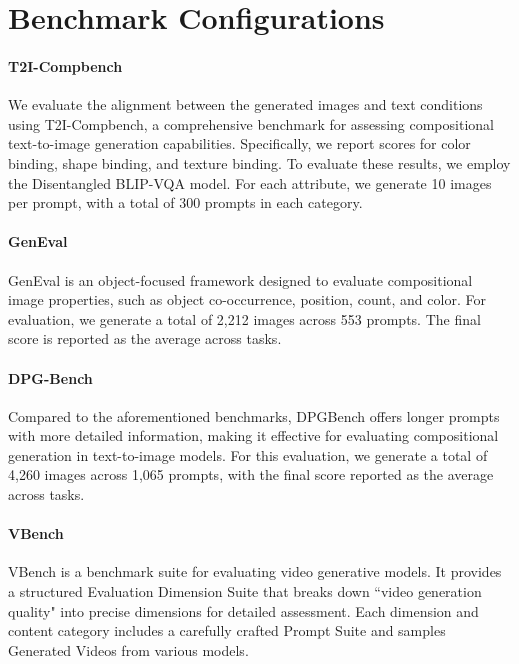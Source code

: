 
\clearpage
\appendix

\renewcommand{\thesection}{\Alph{section}}
\renewcommand{\thesection}{Appendix \Alph{section}}


\section{Benchmark Configurations}\label{appendix:bench-config}

\paragraph{T2I-Compbench~\citep{huang2023t2i-compbench}}  We evaluate the alignment between the generated images and text conditions using T2I-Compbench, a comprehensive benchmark for assessing compositional text-to-image generation capabilities. Specifically, we report scores for color binding, shape binding, and texture binding. To evaluate these results, we employ the Disentangled BLIP-VQA model. For each attribute, we generate 10 images per prompt, with a total of 300 prompts in each category.


\paragraph{GenEval~\citep{ghosh2024geneval}} GenEval is an object-focused framework designed to evaluate compositional image properties, such as object co-occurrence, position, count, and color. For evaluation, we generate a total of 2,212 images across 553 prompts. The final score is reported as the average across tasks.

\paragraph{DPG-Bench~\citep{hu2024ella_dbgbench}} Compared to the aforementioned benchmarks, DPGBench offers longer prompts with more detailed information, making it effective for evaluating compositional generation in text-to-image models. For this evaluation, we generate a total of 4,260 images across 1,065 prompts, with the final score reported as the average across tasks.


\paragraph{VBench~\citep{huang2024vbench}} VBench is a benchmark suite for evaluating video generative models. It provides a structured Evaluation Dimension Suite that breaks down ``video generation quality" into precise dimensions for detailed assessment. Each dimension and content category includes a carefully crafted Prompt Suite and samples Generated Videos from various models. 



